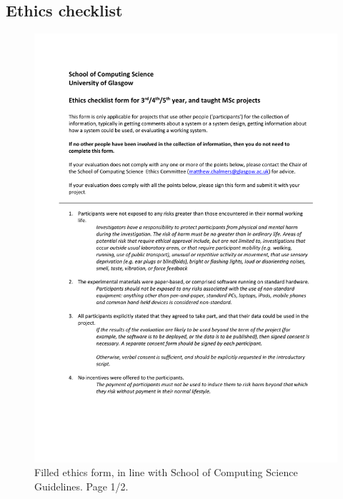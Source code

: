 \documentclass{l4proj}
\begin{document}
\begin{appendices}
\subsection{Ethics checklist}
\begin{figure}[htbp]
    \centering
    \includegraphics[page=1,width=0.85\linewidth]{appendix/Project_Ethics_checklist_signed.pdf}   
    \caption{Filled ethics form, in line with School of Computing Science Guidelines. Page 1/2.}
\end{figure}
\newpage
\begin{figure}[htbp]

\end{figure}
\end{appendices}
\end{document}
